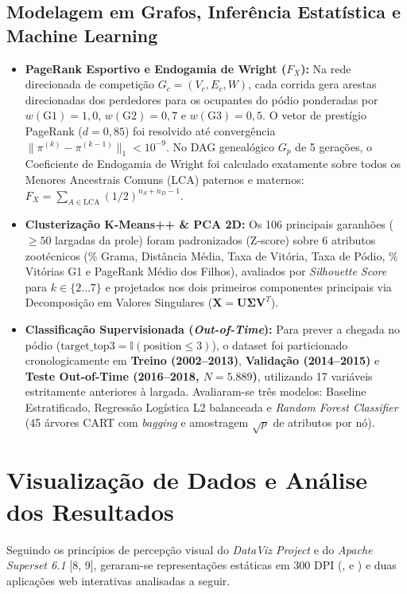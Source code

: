 \documentclass[conference]{IEEEtran}
\begin{document}
\subsection{Modelagem em Grafos, Inferência Estatística e Machine Learning}
\begin{itemize}
    \item \textbf{PageRank Esportivo e Endogamia de Wright ($F_X$):} Na rede direcionada de competição $G_c = (V_c, E_c, W)$, cada corrida gera arestas direcionadas dos perdedores para os ocupantes do pódio ponderadas por $w(\text{G1})=1,0$, $w(\text{G2})=0,7$ e $w(\text{G3})=0,5$. O vetor de prestígio PageRank ($d = 0,85$) foi resolvido até convergência $\|\pi^{(k)} - \pi^{(k-1)}\|_1 < 10^{-9}$. No DAG genealógico $G_p$ de 5 gerações, o Coeficiente de Endogamia de Wright foi calculado exatamente sobre todos os Menores Ancestrais Comuns (LCA) paternos e maternos: $F_X = \sum_{A \in \text{LCA}} (1/2)^{n_S + n_D - 1}$.
    \item \textbf{Clusterização K-Means++ \& PCA 2D:} Os 106 principais garanhões ($\ge 50$ largadas da prole) foram padronizados (Z-score) sobre 6 atributos zootécnicos (\% Grama, Distância Média, Taxa de Vitória, Taxa de Pódio, \% Vitórias G1 e PageRank Médio dos Filhos), avaliados por \textit{Silhouette Score} para $k \in \{2 \dots 7\}$ e projetados nos dois primeiros componentes principais via Decomposição em Valores Singulares ($\mathbf{X} = \mathbf{U}\mathbf{\Sigma}\mathbf{V}^T$).
    \item \textbf{Classificação Supervisionada (\textit{Out-of-Time}):} Para prever a chegada no pódio ($\text{target\_top3} = \mathbb{I}(\text{position} \le 3)$), o dataset foi particionado cronologicamente em \textbf{Treino (2002--2013)}, \textbf{Validação (2014--2015)} e \textbf{Teste Out-of-Time (2016--2018, $N = 5.889$)}, utilizando 17 variáveis estritamente anteriores à largada. Avaliaram-se três modelos: Baseline Estratificado, Regressão Logística L2 balanceada e \textit{Random Forest Classifier} (45 árvores CART com \textit{bagging} e amostragem $\sqrt{p}$ de atributos por nó).
\end{itemize}

\section{Visualização de Dados e Análise dos Resultados}
Seguindo os princípios de percepção visual do \textit{DataViz Project} e do \textit{Apache Superset 6.1} [8, 9], geraram-se representações estáticas em 300 DPI (,  e ) e duas aplicações web interativas analisadas a seguir.
\end{document}
